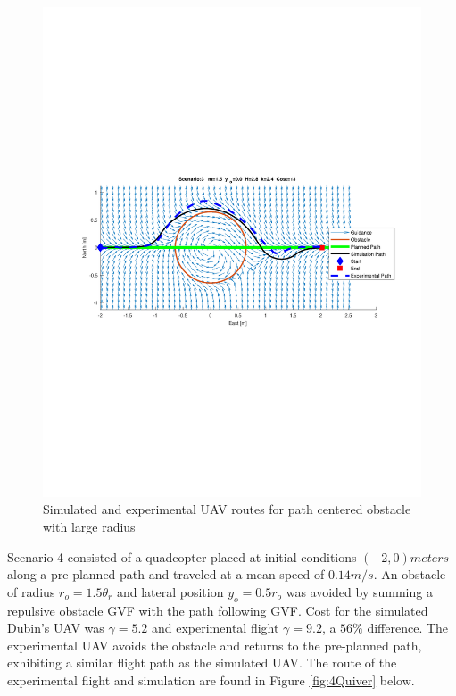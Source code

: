 \documentclass[numbered,pdftex]{ohio-etd}
\begin{document}
\begin{figure}[H]
	\centering
	\includegraphics[trim = 50 250 0 250, clip, width=16.5cm]{Figures/results/compareFigures/3Quiver}
	\caption{Simulated and experimental UAV routes for path centered obstacle with large radius}
	\label{fig:3Quiver}
\end{figure}

Scenario 4 consisted of a quadcopter placed at initial conditions $(-2,0) meters$ along a pre-planned path and traveled at a mean speed of $0.14 m/s$. An obstacle of radius $r_o = 1.5 \theta_r$ and lateral position $y_o=0.5r_o$ was avoided by summing a repulsive obstacle GVF with the path following GVF. Cost for the simulated Dubin's UAV was $\bar{\gamma} = 5.2$ and experimental flight $\bar{\gamma} = 9.2$, a $56 \%$ difference. The experimental UAV avoids the obstacle and returns to the pre-planned path, exhibiting a similar flight path as the simulated UAV. The route of the experimental flight and simulation are found in Figure \ref{fig:4Quiver} below. 
\end{document}
